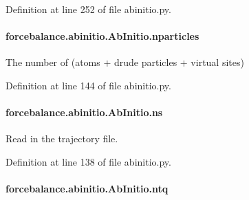 Definition at line 252 of file abinitio.\-py.

\hypertarget{classforcebalance_1_1abinitio_1_1AbInitio_aef3798e4666b91ecc4c526b679eb4908}{
\paragraph[{nparticles}]{\setlength{\rightskip}{0pt plus 5cm}forcebalance.\-abinitio.\-Ab\-Initio.\-nparticles\hspace{0.3cm}{\ttfamily [inherited]}}}\label{classforcebalance_1_1abinitio_1_1AbInitio_aef3798e4666b91ecc4c526b679eb4908}


The number of (atoms + drude particles + virtual sites) 



Definition at line 144 of file abinitio.\-py.

\hypertarget{classforcebalance_1_1abinitio_1_1AbInitio_a1e8248e2efe952362b1b21462a70b540}{
\paragraph[{ns}]{\setlength{\rightskip}{0pt plus 5cm}forcebalance.\-abinitio.\-Ab\-Initio.\-ns\hspace{0.3cm}{\ttfamily [inherited]}}}\label{classforcebalance_1_1abinitio_1_1AbInitio_a1e8248e2efe952362b1b21462a70b540}


Read in the trajectory file. 



Definition at line 138 of file abinitio.\-py.

\hypertarget{classforcebalance_1_1abinitio_1_1AbInitio_af8a895f61ddea6b9ca2765ddbf309a75}{
\paragraph[{ntq}]{\setlength{\rightskip}{0pt plus 5cm}forcebalance.\-abinitio.\-Ab\-Initio.\-ntq\hspace{0.3cm}{\ttfamily [inherited]}}}\label{classforcebalance_1_1abinitio_1_1AbInitio_af8a895f61ddea6b9ca2765ddbf309a75}


